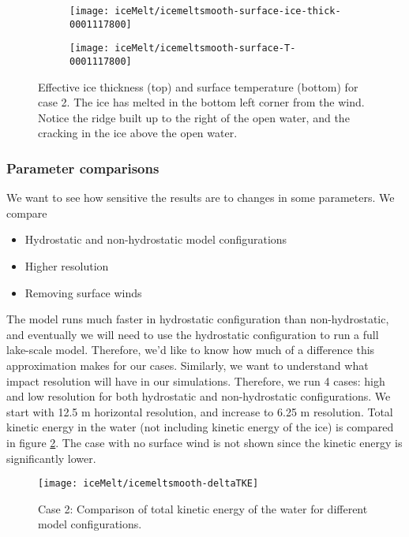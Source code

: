\documentclass[11pt]{article}
\begin{document}
\clearpage
\begin{figure}[h!]
\begin{subfigure}{0.8\linewidth}
\centering
\texttt{[image: iceMelt/icemeltsmooth-surface-ice-thick-0001117800]}
\end{subfigure}
\begin{subfigure}{0.8\linewidth}
\texttt{[image: iceMelt/icemeltsmooth-surface-T-0001117800]}
\end{subfigure}
\caption{Effective ice thickness (top) and surface temperature (bottom) for case 2. The ice has melted in the bottom left corner from the wind. Notice the ridge built up to the right of the open water, and the cracking in the ice above the open water.}
\label{fig:iceMelt0}
\end{figure}

\subsubsection*{Parameter comparisons}
We want to see how sensitive the results are to changes in some parameters. We compare
\begin{itemize}
\item{Hydrostatic and non-hydrostatic model configurations}
\item{Higher resolution}
\item{Removing surface winds}
\end{itemize}
The model runs much faster in hydrostatic configuration than non-hydrostatic, and eventually we will need to use the hydrostatic configuration to run a full lake-scale model. Therefore, we'd like to know how much of a difference this approximation makes for our cases. Similarly, we want to understand what impact resolution will have in our simulations. Therefore, we run 4 cases: high and low resolution for both hydrostatic and non-hydrostatic configurations. We start with 12.5 m horizontal resolution, and increase to 6.25 m resolution. Total kinetic energy in the water (not including kinetic energy of the ice) is compared in figure \ref{fig:iceMeltCompareTKE}. The case with no surface wind is not shown since the kinetic energy is significantly lower.

\begin{figure}[h!]
\centering
\texttt{[image: iceMelt/icemeltsmooth-deltaTKE]}
\caption{Case 2: Comparison of total kinetic energy of the water for different model configurations.}
\label{fig:iceMeltCompareTKE}
\end{figure}
\end{document}
